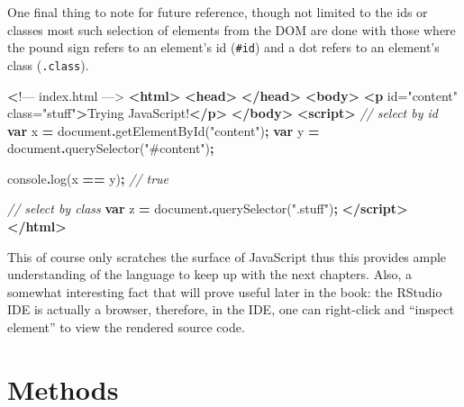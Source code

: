 \documentclass[
]{krantz}
\makeatletter
\newenvironment{Shaded}{\begin{snugshade}}{\end{snugshade}}
\newcommand{\BuiltInTok}[1]{#1}
\newcommand{\CommentTok}[1]{\textcolor[rgb]{0.37,0.37,0.37}{\textit{#1}}}
\newcommand{\ErrorTok}[1]{\textcolor[rgb]{0.14,0.14,0.14}{\textbf{#1}}}
\newcommand{\FunctionTok}[1]{\textcolor[rgb]{0,0,0}{#1}}
\newcommand{\KeywordTok}[1]{\textcolor[rgb]{0.27,0.27,0.27}{\textbf{#1}}}
\newcommand{\NormalTok}[1]{#1}
\newcommand{\OperatorTok}[1]{\textcolor[rgb]{0.43,0.43,0.43}{\textbf{#1}}}
\newcommand{\OtherTok}[1]{\textcolor[rgb]{0.37,0.37,0.37}{#1}}
\newcommand{\StringTok}[1]{\textcolor[rgb]{0.5,0.5,0.5}{#1}}
\newenvironment{kframe}{%
\medskip{}
\setlength{\fboxsep}{.8em}
 \def\at@end@of@kframe{}%
 \ifinner\ifhmode%
  \def\at@end@of@kframe{\end{minipage}}%
  \begin{minipage}{\columnwidth}%
 \fi\fi%
 \def\FrameCommand##1{\hskip\@totalleftmargin \hskip-\fboxsep
 \colorbox{shadecolor}{##1}\hskip-\fboxsep
     \hskip-\linewidth \hskip-\@totalleftmargin \hskip\columnwidth}%
 \MakeFramed {\advance\hsize-\width
   \@totalleftmargin\z@ \linewidth\hsize
   \@setminipage}}%
 {\par\unskip\endMakeFramed%
 \at@end@of@kframe}
\renewenvironment{Shaded}{\begin{kframe}}{\end{kframe}}
\makeatother
\begin{document}
One final thing to note for future reference, though not limited to the ids or classes most such selection of elements from the DOM are done with those where the pound sign refers to an element's id (\texttt{\#id}) and a dot refers to an element's class (\texttt{.class}).

\begin{Shaded}
\begin{Highlighting}[]
 \ErrorTok{\textless{}}\NormalTok{!–– index.html ––\textgreater{}}
\KeywordTok{\textless{}html\textgreater{}}
  \KeywordTok{\textless{}head\textgreater{}}
  \KeywordTok{\textless{}/head\textgreater{}}
  \KeywordTok{\textless{}body\textgreater{}}
    \KeywordTok{\textless{}p}\OtherTok{ id=}\StringTok{"content"}\OtherTok{ class=}\StringTok{"stuff"}\KeywordTok{\textgreater{}}\NormalTok{Trying JavaScript!}\KeywordTok{\textless{}/p\textgreater{}}
  \KeywordTok{\textless{}/body\textgreater{}}
  \KeywordTok{\textless{}script\textgreater{}}
    \CommentTok{// select by id}
    \KeywordTok{var}\NormalTok{ x }\OperatorTok{=} \BuiltInTok{document}\OperatorTok{.}\FunctionTok{getElementById}\NormalTok{(}\StringTok{"content"}\NormalTok{)}\OperatorTok{;}
    \KeywordTok{var}\NormalTok{ y }\OperatorTok{=} \BuiltInTok{document}\OperatorTok{.}\FunctionTok{querySelector}\NormalTok{(}\StringTok{"\#content"}\NormalTok{)}\OperatorTok{;}

    \BuiltInTok{console}\OperatorTok{.}\FunctionTok{log}\NormalTok{(x }\OperatorTok{==}\NormalTok{ y)}\OperatorTok{;} \CommentTok{// true}

    \CommentTok{// select by class}
    \KeywordTok{var}\NormalTok{ z }\OperatorTok{=} \BuiltInTok{document}\OperatorTok{.}\FunctionTok{querySelector}\NormalTok{(}\StringTok{".stuff"}\NormalTok{)}\OperatorTok{;}
  \KeywordTok{\textless{}/script\textgreater{}}
\KeywordTok{\textless{}/html\textgreater{}}
\end{Highlighting}
\end{Shaded}

This of course only scratches the surface of JavaScript thus this provides ample understanding of the language to keep up with the next chapters. Also, a somewhat interesting fact that will prove useful later in the book: the RStudio IDE is actually a browser, therefore, in the IDE, one can right-click and ``inspect element'' to view the rendered source code.

\hypertarget{methods}{%
\section*{Methods}\label{methods}}
\end{document}
